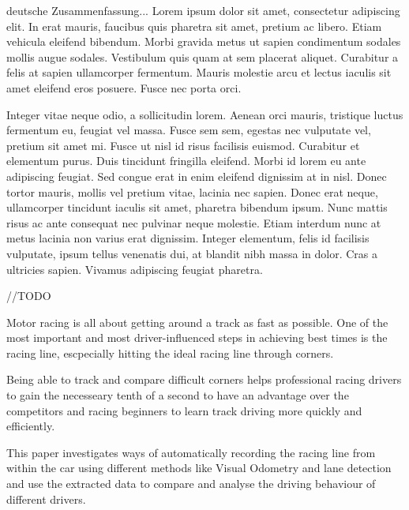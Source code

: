 \documentclass[%
a4paper,
DIV12, 
2.5headlines, 
bigheadings, 
titlepage, 
openbib,
]{scrartcl}
\newcommand{\mainmatter}{\pagenumbering{arabic}\setcounter{page}{1}}
\begin{document}
	\myabstract
	{%
	deutsche Zusammenfassung...
	Lorem ipsum dolor sit amet, consectetur adipiscing elit. In erat mauris, faucibus quis pharetra sit amet, pretium ac libero. Etiam vehicula eleifend bibendum. Morbi gravida metus ut sapien condimentum sodales mollis augue sodales. Vestibulum quis quam at sem placerat aliquet. Curabitur a felis at sapien ullamcorper fermentum. Mauris molestie arcu et lectus iaculis sit amet eleifend eros posuere. Fusce nec porta orci.

Integer vitae neque odio, a sollicitudin lorem. Aenean orci mauris, tristique luctus fermentum eu, feugiat vel massa. Fusce sem sem, egestas nec vulputate vel, pretium sit amet mi. Fusce ut nisl id risus facilisis euismod. Curabitur et elementum purus. Duis tincidunt fringilla eleifend. Morbi id lorem eu ante adipiscing feugiat. Sed congue erat in enim eleifend dignissim at in nisl. Donec tortor mauris, mollis vel pretium vitae, lacinia nec sapien. Donec erat neque, ullamcorper tincidunt iaculis sit amet, pharetra bibendum ipsum. Nunc mattis risus ac ante consequat nec pulvinar neque molestie. Etiam interdum nunc at metus lacinia non varius erat dignissim. Integer elementum, felis id facilisis vulputate, ipsum tellus venenatis dui, at blandit nibh massa in dolor. Cras a ultricies sapien. Vivamus adipiscing feugiat pharetra.
	}{%
//TODO

	Motor racing is all about getting around a track as fast as possible. One of the most important and most driver-influenced steps in achieving best times is the racing line, escpecially hitting the ideal racing line through corners.

Being able to track and compare difficult corners helps professional racing drivers to gain the necesseary tenth of a second to have an advantage over the competitors and racing beginners to learn track driving more quickly and efficiently.

This paper investigates ways of automatically recording the racing line from within the car using different methods like Visual Odometry and lane detection and use the extracted data to compare and analyse the driving behaviour of different drivers.
	}
	
	\tableofcontents
	\clearpage
	\mainmatter

	
	
	
	
	
	
	
	
	
	
	\clearpage	
	
	
	
	
\end{document}
